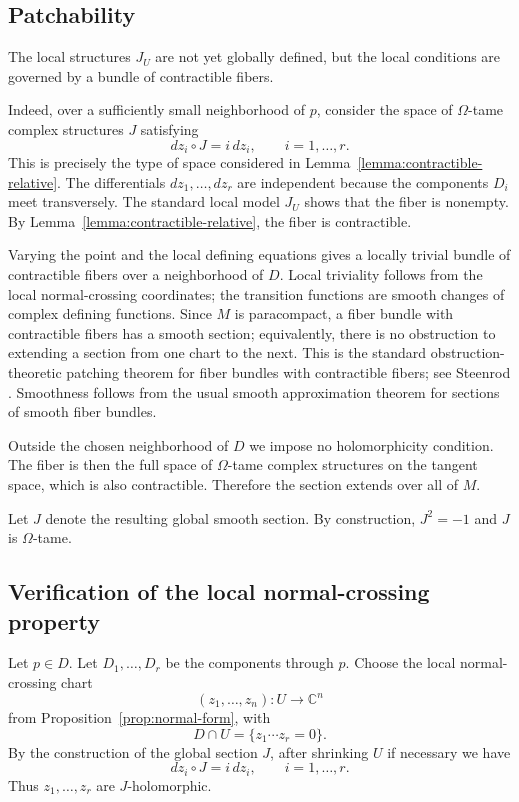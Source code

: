 \documentclass{amsart}
\theoremstyle{definition}
\newcommand{\C}{\mathbb C}
\begin{document}
\subsection{Patchability}

The local structures $J_U$ are not yet globally defined, but the local conditions are
governed by a bundle of contractible fibers.

Indeed, over a sufficiently small neighborhood of $p$, consider the space of
$\Omega$-tame complex structures $J$ satisfying
\[
dz_i\circ J=i\,dz_i,\qquad i=1,\dots,r.
\]
This is precisely the type of space considered in
Lemma~\ref{lemma:contractible-relative}. The differentials $dz_1,\dots,dz_r$ are
independent because the components $D_i$ meet transversely. The standard local model $J_U$
shows that the fiber is nonempty. By Lemma~\ref{lemma:contractible-relative}, the fiber is
contractible.

Varying the point and the local defining equations gives a locally trivial bundle of
contractible fibers over a neighborhood of $D$. Local triviality follows from the local
normal-crossing coordinates; the transition functions are smooth changes of complex defining
functions. Since $M$ is paracompact, a fiber bundle with contractible fibers has a smooth
section; equivalently, there is no obstruction to extending a section from one chart to the
next. This is the standard obstruction-theoretic patching theorem for fiber bundles with
contractible fibers; see Steenrod \cite{Steenrod}. Smoothness follows from the usual
smooth approximation theorem for sections of smooth fiber bundles.

Outside the chosen neighborhood of $D$ we impose no holomorphicity condition. The fiber is
then the full space of $\Omega$-tame complex structures on the tangent space, which is also
contractible. Therefore the section extends over all of $M$.

Let $J$ denote the resulting global smooth section. By construction, $J^2=-1$ and $J$ is
$\Omega$-tame.

\subsection{Verification of the local normal-crossing property}

Let $p\in D$. Let $D_1,\dots,D_r$ be the components through $p$. Choose the local
normal-crossing chart
\[
(z_1,\dots,z_n):U\to\C^n
\]
from Proposition~\ref{prop:normal-form}, with
\[
D\cap U=\{z_1\cdots z_r=0\}.
\]
By the construction of the global section $J$, after shrinking $U$ if necessary we have
\[
dz_i\circ J=i\,dz_i,\qquad i=1,\dots,r.
\]
Thus $z_1,\dots,z_r$ are $J$-holomorphic.
\end{document}
